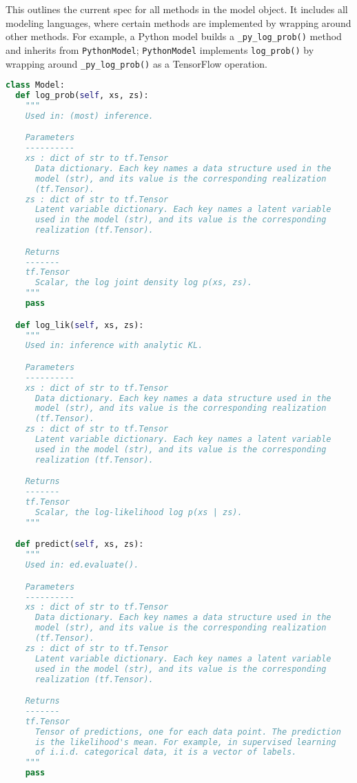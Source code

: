 This outlines the current spec for all methods in the model object.
It includes all modeling languages, where certain methods are
implemented by wrapping around other methods. For example, a Python
model builds a \texttt{_py_log_prob()} method and inherits from
\texttt{PythonModel}; \texttt{PythonModel} implements \texttt{log_prob()} by wrapping
around \texttt{_py_log_prob()} as a TensorFlow operation.

\begin{lstlisting}[language=Python]
class Model:
  def log_prob(self, xs, zs):
    """
    Used in: (most) inference.

    Parameters
    ----------
    xs : dict of str to tf.Tensor
      Data dictionary. Each key names a data structure used in the
      model (str), and its value is the corresponding realization
      (tf.Tensor).
    zs : dict of str to tf.Tensor
      Latent variable dictionary. Each key names a latent variable
      used in the model (str), and its value is the corresponding
      realization (tf.Tensor).

    Returns
    -------
    tf.Tensor
      Scalar, the log joint density log p(xs, zs).
    """
    pass

  def log_lik(self, xs, zs):
    """
    Used in: inference with analytic KL.

    Parameters
    ----------
    xs : dict of str to tf.Tensor
      Data dictionary. Each key names a data structure used in the
      model (str), and its value is the corresponding realization
      (tf.Tensor).
    zs : dict of str to tf.Tensor
      Latent variable dictionary. Each key names a latent variable
      used in the model (str), and its value is the corresponding
      realization (tf.Tensor).

    Returns
    -------
    tf.Tensor
      Scalar, the log-likelihood log p(xs | zs).
    """

  def predict(self, xs, zs):
    """
    Used in: ed.evaluate().

    Parameters
    ----------
    xs : dict of str to tf.Tensor
      Data dictionary. Each key names a data structure used in the
      model (str), and its value is the corresponding realization
      (tf.Tensor).
    zs : dict of str to tf.Tensor
      Latent variable dictionary. Each key names a latent variable
      used in the model (str), and its value is the corresponding
      realization (tf.Tensor).

    Returns
    -------
    tf.Tensor
      Tensor of predictions, one for each data point. The prediction
      is the likelihood's mean. For example, in supervised learning
      of i.i.d. categorical data, it is a vector of labels.
    """
    pass


\end{lstlisting}
